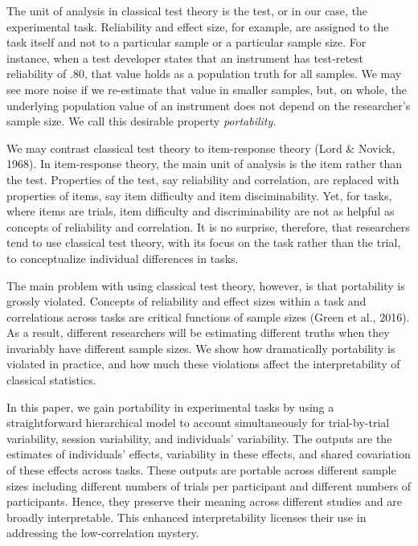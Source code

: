 \documentclass[english,man]{apa6}
\theoremstyle{definition}
\theoremstyle{definition}
\theoremstyle{remark}
\begin{document}
The unit of analysis in classical test theory is the test, or in our
case, the experimental task. Reliability and effect size, for example,
are assigned to the task itself and not to a particular sample or a
particular sample size. For instance, when a test developer states that
an instrument has test-retest reliability of .80, that value holds as a
population truth for all samples. We may see more noise if we
re-estimate that value in smaller samples, but, on whole, the underlying
population value of an instrument does not depend on the researcher's
sample size. We call this desirable property \emph{portability.}

We may contrast classical test theory to item-response theory (Lord \&
Novick, 1968). In item-response theory, the main unit of analysis is the
item rather than the test. Properties of the test, say reliability and
correlation, are replaced with properties of items, say item difficulty
and item disciminability. Yet, for tasks, where items are trials, item
difficulty and discriminability are not as helpful as concepts of
reliability and correlation. It is no surprise, therefore, that
researchers tend to use classical test theory, with its focus on the
task rather than the trial, to conceptualize individual differences in
tasks.

The main problem with using classical test theory, however, is that
portability is grossly violated. Concepts of reliability and effect
sizes within a task and correlations across tasks are critical functions
of sample sizes (Green et al., 2016). As a result, different researchers
will be estimating different truths when they invariably have different
sample sizes. We show how dramatically portability is violated in
practice, and how much these violations affect the interpretability of
classical statistics.

In this paper, we gain portability in experimental tasks by using a
straightforward hierarchical model to account simultaneously for
trial-by-trial variability, session variability, and individuals'
variability. The outputs are the estimates of individuals' effects,
variability in these effects, and shared covariation of these effects
across tasks. These outputs are portable across different sample sizes
including different numbers of trials per participant and different
numbers of participants. Hence, they preserve their meaning across
different studies and are broadly interpretable. This enhanced
interpretability licenses their use in addressing the low-correlation
mystery.
\end{document}
